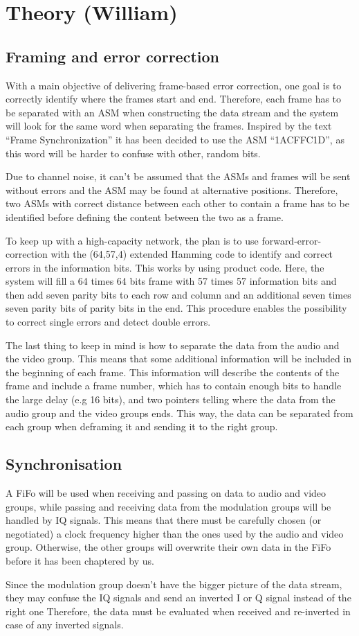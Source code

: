 \section{Theory (William)}

\subsection{Framing and error correction}
With a main objective of delivering frame-based error correction, one goal is to correctly identify where the frames start and end. Therefore, each frame has to be separated with an ASM when constructing the data stream and the system will look for the same word when separating the frames. Inspired by the text “Frame Synchronization” it has been decided to use the ASM “1ACFFC1D”, as this word will be harder to confuse with other, random bits.

Due to channel noise, it can’t be assumed that the ASMs and frames will be sent without errors and the ASM may be found at alternative positions. Therefore, two ASMs with correct distance between each other to contain a frame has to be identified before defining the content between the two as a frame.

To keep up with a high-capacity network, the plan is to use forward-error-correction with the (64,57,4) extended Hamming code to identify and correct errors in the information bits. This works by using product code. Here, the system will fill a 64 times 64 bits frame with 57 times 57 information bits and then add seven parity bits to each row and column and an additional seven times seven parity bits of parity bits in the end. This procedure enables the possibility to correct single errors and detect double errors.

The last thing to keep in mind is how to separate the data from the audio and the video group. This means that some additional information will be included in the beginning of each frame. This information will describe the contents of the frame and include a frame number, which has to contain enough bits to handle the large delay (e.g 16 bits), and two pointers telling where the data from the audio group and the video groups ends. This way, the data can be separated from each group when deframing it and sending it to the right group.

\subsection{Synchronisation}
A FiFo will be used when receiving and passing on data to audio and video groups, while passing and receiving data from the modulation groups will be handled by IQ signals. This means that there must be carefully chosen (or negotiated) a clock frequency higher than the ones used by the audio and video group. Otherwise, the other groups will overwrite their own data in the FiFo before it has been chaptered by us.

Since the modulation group doesn’t have the bigger picture of the data stream, they may confuse the IQ signals and send an inverted I or Q signal instead of the right one Therefore, the data must be evaluated when received and re-inverted in case of any inverted signals.
